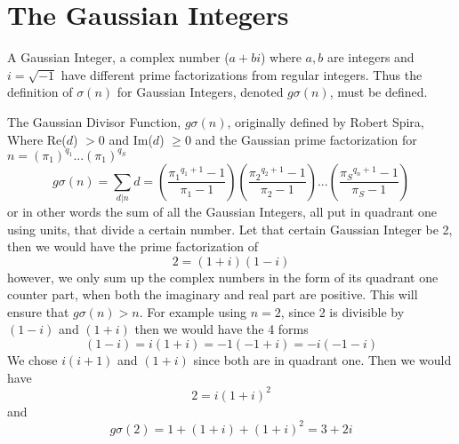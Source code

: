 \documentclass[12pt]{amsart}
\begin{document}
\section{The Gaussian Integers}
A Gaussian Integer, a complex number ($a + bi$) where $a, b$ are integers and $i = \sqrt{-1}$ have different prime factorizations from regular integers. Thus the definition of $\sigma(n)$ for Gaussian Integers, denoted $g\sigma(n)$, must be defined.

The Gaussian Divisor Function, $g \sigma(n)$, originally defined by Robert Spira, Where Re($d$) $> 0$ and Im($d$) $\geq 0$ and the Gaussian prime factorization for $ n = (\pi_1)^{q_1}...(\pi_1)^{q_S}$ $$g\sigma(n) = \sum_{d|{n}}d = (\frac{{\pi_1}^{q_1+1} - 1} {{\pi_1} - 1}) (\frac{{\pi_2}^{q_2+1} - 1}{{\pi_2} - 1})...(\frac{{\pi_S}^{q_n+1} - 1}{{\pi_S} - 1}) $$ or in other words the sum of all the Gaussian Integers, all put in quadrant one using units, that divide a certain number. Let that certain Gaussian Integer be 2, then we would have the prime factorization of $$ 2 = (1 + i)(1-i) $$ however, we only sum up the complex numbers in the form of its quadrant one counter part, when both the imaginary and real part are positive. This will ensure that $g\sigma(n)>n$. For example using $n = 2$, since 2 is divisible by $(1-i)$ and $(1+i)$ then we would have the 4 forms $$ (1- i) = i(1 + i) = -1(-1 + i) = -i(-1-i)$$ 
We chose $i(i + 1)$  and $(1+i)$ since both are in quadrant one. Then we would have 
$$2 = i(1+i)^2$$ and
$$g \sigma(2) = 1 + (1+i) + (1+i)^2 = 3 + 2i$$
\\
\end{document}
